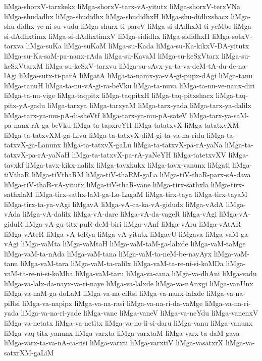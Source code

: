 {liMga-shorxV-tarxkekx
liMga-shorxV-tarx-vA-yitutx
liMga-shorxV-terxVNa
liMga-shudadhx
liMga-shudidhx
liMga-shudidhxH
liMga-shu-didhxshacx
liMga-shu-didhx-ye-ni-su-vudu
liMga-shurx-ti-pareV
liMga-si-dAdhxM-ti-yeMbe
liMga-si-dAdhxtimx
liMga-si-dAdhxtimxV
liMga-sididhx
liMga-sididhxH
liMga-sotxV-tarxva
liMga-suKa
liMga-suKaM
liMga-su-Kada
liMga-su-Ka-kikxV-DA-yitutx
liMga-su-Ka-saM-pa-nanx-rAda
liMga-su-KavaM
liMga-su-keSxVtarx
liMga-su-keSxVtarxM
liMga-su-keSxV-tarxvu
liMga-su-sAvx-ya-ta-va-deM-tA-du-de-na-lAgi
liMga-sutx-ti-parA
liMgatA
liMga-ta-namx-ya-vA-gi-pupx-dAgi
liMga-tanu
liMga-tanuH
liMga-ta-nu-vA-gi-ra-beVku
liMga-ta-nuva
liMga-ta-nu-ve-nanx-diri
liMga-ta-nu-vige
liMga-taqpitx
liMga-taqpitxH
liMga-taq-pitxshacx
liMga-taq-pitx-yA-gadu
liMga-tarxya
liMga-tarxyaM
liMga-tarx-yada
liMga-tarx-ya-dalilx
liMga-tarx-ya-mu-pA-di-sheVtf
liMga-tarx-ya-mu-pA-sateV
liMga-tarx-ya-saM-pa-nanx-rA-ga-beVku
liMga-ta-tapxreYH
liMga-tatatxvX
liMga-tatatxvXM
liMga-ta-tatxvXM-ga-Livu
liMga-ta-tatxvX-diM-gi-ta-va-na-ridu
liMga-ta-tatxvX-ga-Lanunx
liMga-ta-tatxvX-gaLu
liMga-ta-tatxvX-pa-rA-yaNa
liMga-ta-tatxvX-pa-rA-yaNaH
liMga-ta-tatxvX-pa-rA-yaNeYH
liMga-tatetxvXV
liMga-tavxkf
liMga-tavx-kikx-nalilx
liMga-tavxkukx
liMga-tavx-vanunx
liMgati
liMga-tiVthaR
liMga-tiVthaRM
liMga-tiV-thaRM-gaLa
liMga-tiV-thaR-parx-sA-dava
liMga-tiV-thaR-vA-yitutx
liMga-tiV-thaR-vane
liMga-tirx-sathxla
liMga-tirx-sathxlaM
liMga-tirx-sathx-laM-ga-Lo-LagaM
liMga-tirx-taya
liMga-tirx-tayaM
liMga-tirx-ta-ya-vAgi
liMgavA
liMga-vA-ca-ka-vA-gidudx
liMga-vAdA
liMga-vAda
liMga-vA-dalilx
liMga-vA-dare
liMga-vA-da-vageR
liMga-vAgi
liMga-vA-giduR
liMga-vA-gu-titx-puR-deM-biri
liMga-vAnf
liMga-vAru
liMga-vAtAR
liMga-vAteR
liMga-vA-teRya
liMga-vA-yitutx
liMgavU
liMgava
liMga-vaM-ga-vAgi
liMga-vaMta
liMga-vaMtaH
liMga-vaM-taM-ga-lalxde
liMga-vaM-taMge
liMga-vaM-ta-nAda
liMga-vaM-tana
liMga-vaM-ta-neM-be-nayAyx
liMga-vaM-tanu
liMga-vaM-tara
liMga-vaM-ta-ralilx
liMga-vaM-ta-re-ni-si-koMDa
liMga-vaM-ta-re-ni-si-koMba
liMga-vaM-taru
liMga-va-cana
liMga-va-dhAni
liMga-vadu
liMga-va-lalx-da-nayx-va-ri-naye
liMga-va-lalxde
liMga-va-nAnxgi
liMga-vanUnx
liMga-va-naM-ga-doLaM
liMga-va-na-ciRsi
liMga-va-nanx-lalxde
liMga-va-na-piRsi
liMga-va-napipx
liMga-va-na-rasi
liMga-va-na-ri-da-vaMge
liMga-va-na-ri-yada
liMga-va-na-ri-yade
liMga-vane
liMga-vaneV
liMga-va-neYdu
liMga-vanenxV
liMga-va-netatx
liMga-va-netitx
liMga-va-no-li-si-daru
liMga-vanu
liMga-vanunx
liMga-vaq-titx-yanunx
liMga-varxta
liMga-varxtaM
liMga-varx-ta-daM-gava
liMga-varx-ta-va-nA-ca-risi
liMga-varxti
liMga-varxtiV
liMga-vasatxrX
liMga-va-satxrXM-gaLiM
}
